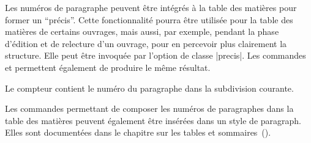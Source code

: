 Les numéros de paragraphe peuvent être intégrés à la table des matières pour former un \enquote{précis}. Cette fonctionnalité pourra être utilisée pour la table des matières de certains ouvrages, mais aussi, par exemple, pendant la phase d'édition et de relecture d'un ouvrage, pour en percevoir plus clairement la structure. Elle peut être invoquée par l'option de classe |precis|. Les commandes  et  permettent également de produire le même résultat.

\begin{noprint}
\newcommand{\precis}{\@precistrue}
\newcommand{\noprecis}{\@precisfalse}
\end{noprint}

\begin{developer}
Le compteur  contient le numéro du paragraphe dans la subdivision courante.
\end{developer}

\begin{noprint}
\setcounter{precis}{0}
\end{noprint}

Les commandes permettant de composer les numéros de paragraphes dans la table des matières peuvent également être insérées dans un style de paragraph. Elles sont documentées dans le chapitre sur les tables et sommaires~(\pageref{tables-of-contents}).

\begin{noprint}
\newcommand{\cftparastyle}{\llap}
\newcommand{\cftparanumstyle}{\bfseries}
\newcommand{\cftparaaftersnum}{.\enskip}
\newcommand{\cftparanumsep}{,~}
\newcommand{\cftparaleader}{p.~}
\newcommand{\cftparaafterpnum}{.}
\newcommand{\cftparasep}{\par}
\end{noprint}

